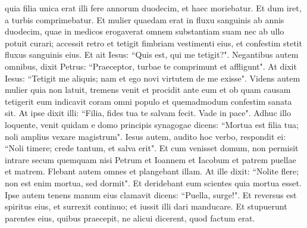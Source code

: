 \begin{biblechapter}
\verse quia filia unica erat illi fere annorum duodecim, et haec moriebatur. Et dum iret, a turbis comprimebatur. 
\verse Et mulier quaedam erat in fluxu sanguinis ab annis duodecim, quae in medicos erogaverat omnem substantiam suam nec ab ullo potuit curari; 
\verse accessit retro et tetigit fimbriam vestimenti eius, et confestim stetit fluxus sanguinis eius. 
\verse Et ait Iesus: “Quis est, qui me tetigit?". Negantibus autem omnibus, dixit Petrus: “Praeceptor, turbae te comprimunt et affligunt". 
\verse At dixit Iesus: “Tetigit me aliquis; nam et ego novi virtutem de me exisse". 
\verse Videns autem mulier quia non latuit, tremens venit et procidit ante eum et ob quam causam tetigerit eum indicavit coram omni populo et quemadmodum confestim sanata sit. 
\verse At ipse dixit illi: “Filia, fides tua te salvam fecit. Vade in pace". 
\verse Adhuc illo loquente, venit quidam e domo principis synagogae dicens: “Mortua est filia tua; noli amplius vexare magistrum". 
\verse Iesus autem, audito hoc verbo, respondit ei: “Noli timere; crede tantum, et salva erit". 
\verse Et cum venisset domum, non permisit intrare secum quemquam nisi Petrum et Ioannem et Iacobum et patrem puellae et matrem. 
\verse Flebant autem omnes et plangebant illam. At ille dixit: “Nolite flere; non est enim mortua, sed dormit". 
\verse Et deridebant eum scientes quia mortua esset. 
\verse Ipse autem tenens manum eius clamavit dicens: “Puella, surge!". 
\verse Et reversus est spiritus eius, et surrexit continuo; et iussit illi dari manducare. 
\verse Et stupuerunt parentes eius, quibus praecepit, ne alicui dicerent, quod factum erat. 
\end{biblechapter}

